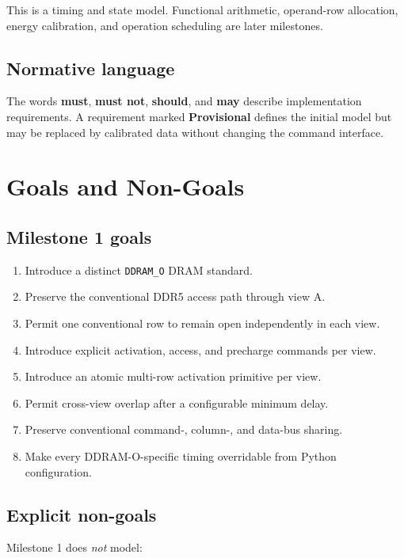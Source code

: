 \documentclass[9pt,twocolumn]{extarticle}
\newcommand{\cmd}[1]{\texttt{#1}}
\newcommand{\viewA}{\textsf{A}}
\newcommand{\provisional}{\textcolor{DDRAMOrange}{\textbf{Provisional}}}
\begin{document}
This is a timing and state model. Functional arithmetic, operand-row
allocation, energy calibration, and operation scheduling are later milestones.

\subsection{Normative language}

The words \textbf{must}, \textbf{must not}, \textbf{should}, and \textbf{may}
describe implementation requirements. A requirement marked \provisional{}
defines the initial model but may be replaced by calibrated data without
changing the command interface.

\section{Goals and Non-Goals}

\subsection{Milestone 1 goals}

\begin{enumerate}
  \item Introduce a distinct \cmd{DDRAM\_O} DRAM standard.
  \item Preserve the conventional DDR5 access path through view \viewA{}.
  \item Permit one conventional row to remain open independently in each view.
  \item Introduce explicit activation, access, and precharge commands per view.
  \item Introduce an atomic multi-row activation primitive per view.
  \item Permit cross-view overlap after a configurable minimum delay.
  \item Preserve conventional command-, column-, and data-bus sharing.
  \item Make every DDRAM-O-specific timing overridable from Python configuration.
\end{enumerate}

\subsection{Explicit non-goals}

Milestone 1 does \emph{not} model:
\end{document}

